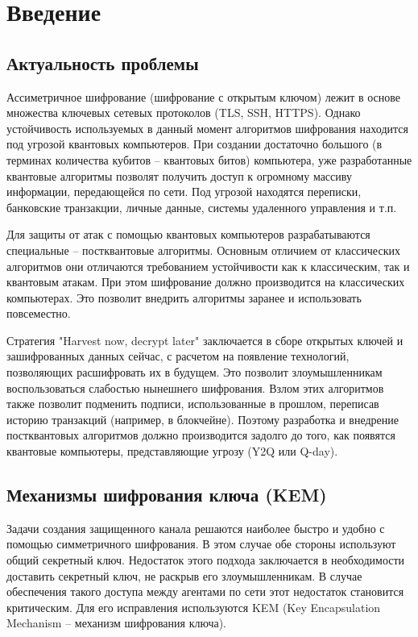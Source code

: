 \chapter{Введение}
\label{ch:intro}

\section{Актуальность проблемы}
Ассиметричное шифрование (шифрование с открытым ключом) лежит в основе множества ключевых сетевых протоколов (TLS, SSH, HTTPS). Однако устойчивость используемых в данный момент алгоритмов шифрования находится под угрозой квантовых компьютеров. При создании достаточно большого (в терминах количества кубитов -- квантовых битов) компьютера, уже разработанные квантовые алгоритмы позволят получить доступ к огромному массиву информации, передающейся по сети. Под угрозой находятся переписки, банковские транзакции, личные данные, системы удаленного управления и т.п.

Для защиты от атак с помощью квантовых компьютеров разрабатываются специальные -- постквантовые алгоритмы. Основным отличием от классических алгоритмов они отличаются требованием устойчивости как к классическим, так и квантовым атакам. При этом шифрование должно производится на классических компьютерах. Это позволит внедрить алгоритмы заранее и использовать повсеместно.

Стратегия "Harvest now, decrypt later"\; заключается в сборе открытых ключей и зашифрованных данных сейчас, с расчетом на появление технологий, позволяющих расшифровать их в будущем. Это позволит злоумышленникам воспользоваться слабостью нынешнего шифрования. Взлом этих алгоритмов также позволит подменить подписи, использованные в прошлом, переписав историю транзакций (например, в блокчейне). Поэтому разработка и внедрение постквантовых алгоритмов должно производится задолго до того, как появятся квантовые компьютеры, представляющие угрозу (Y2Q или Q-day).

\section{Механизмы шифрования ключа (KEM)}

Задачи создания защищенного канала решаются наиболее быстро и удобно с помощью симметричного шифрования. В этом случае обе стороны используют общий секретный ключ. Недостаток этого подхода заключается в необходимости доставить секретный ключ, не раскрыв его злоумышленникам. В случае обеспечения такого доступа между агентами по сети этот недостаток становится критическим. Для его исправления используются KEM (Key Encapsulation Mechanism -- механизм шифрования ключа).

